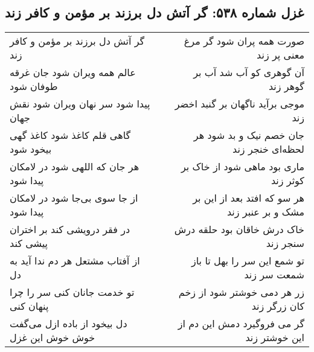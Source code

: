 \begin{center}
\section*{غزل شماره ۵۳۸: گر آتش دل برزند بر مؤمن و کافر زند}
\label{sec:0538}
\begin{longtable}{l p{0.5cm} r}
گر آتش دل برزند بر مؤمن و کافر زند
&&
صورت همه پران شود گر مرغ معنی پر زند
\\
عالم همه ویران شود جان غرقه طوفان شود
&&
آن گوهری کو آب شد آب بر گوهر زند
\\
پیدا شود سر نهان ویران شود نقش جهان
&&
موجی برآید ناگهان بر گنبد اخضر زند
\\
گاهی قلم کاغذ شود کاغذ گهی بیخود شود
&&
جان خصم نیک و بد شود هر لحظه‌ای خنجر زند
\\
هر جان که اللهی شود در لامکان پیدا شود
&&
ماری بود ماهی شود از خاک بر کوثر زند
\\
از جا سوی بی‌جا شود در لامکان پیدا شود
&&
هر سو که افتد بعد از این بر مشک و بر عنبر زند
\\
در فقر درویشی کند بر اختران پیشی کند
&&
خاک درش خاقان بود حلقه درش سنجر زند
\\
از آفتاب مشتعل هر دم ندا آید به دل
&&
تو شمع این سر را بهل تا باز شمعت سر زند
\\
تو خدمت جانان کنی سر را چرا پنهان کنی
&&
زر هر دمی خوشتر شود از زخم کان زرگر زند
\\
دل بیخود از باده ازل می‌گفت خوش خوش این غزل
&&
گر می فروگیرد دمش این دم از این خوشتر زند
\\
\end{longtable}
\end{center}
